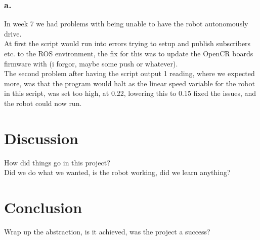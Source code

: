 \documentclass{article}
\begin{document}
\subsubsection*{a.} 
In week 7 we had problems with being unable to have the robot autonomously drive.\\
At first the script would run into errors trying to setup and publish subscribers etc. to the ROS environment,
the fix for this was to update the OpenCR boards firmware with (i forgor, maybe some push or whatever).\\
The second problem after having the script output 1 reading, where we expected more, was that the program would
halt as the linear speed variable for the robot in this script, was set too high, at 0.22, lowering this to 0.15
fixed the issues, and the robot could now run.


\pagebreak


\section*{Discussion}
 \addtocounter{section}{1}
How did things go in this project? \\
Did we do what we wanted, is the robot working, did we learn anything?\\

\section*{Conclusion}
 \addtocounter{section}{1}
Wrap up the abstraction, is it achieved, was the project a success?

\vspace{3mm}
\end{document}
